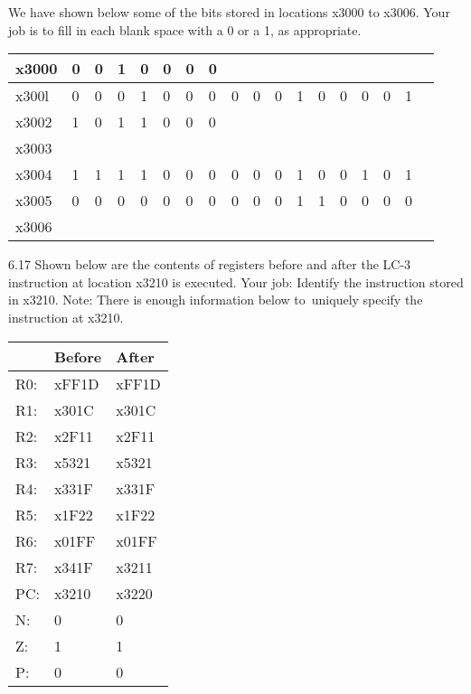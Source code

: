 \documentclass{patt}
\begin{document}
\begin{exercises}
\noindent
We have shown below some of the bits stored in locations x3000 to
x3006. Your job is to fill in each blank space with a 0 or a 1, as
appropriate.

\begin{inlinetable}
\begin{tabular}{|l|l|l|l|l|l|l|l|l|l|l|l|l|l|l|l|l|l|}
\hline
\rule{0pt}{10pt} x3000 & 0 & 0 & 1 & 0 & 0 & 0 & 0 &   &   &   &   &   &   &   &   &  \\\hline
\rule{0pt}{10pt} x300l & 0 & 0 & 0 & 1 & 0 & 0 & 0 & 0 & 0 & 0 & 1 & 0 & 0 & 0 & 0 & 1\\\hline
\rule{0pt}{10pt} x3002 & 1 & 0 & 1 & 1 & 0 & 0 & 0 &   &   &   &   &   &   &   &   &  \\\hline
\rule{0pt}{10pt} x3003 &   &   &   &   &   &   &   &   &   &   &   &   &   &   &   &  \\\hline
\rule{0pt}{10pt} x3004 & 1 & 1 & 1 & 1 & 0 & 0 & 0 & 0 & 0 & 0 & 1 & 0 & 0 & 1 & 0 & 1\\\hline
\rule{0pt}{10pt} x3005 & 0 & 0 & 0 & 0 & 0 & 0 & 0 & 0 & 0 & 0 & 1 & 1 & 0 & 0 & 0 & 0\\\hline
\rule{0pt}{10pt} x3006 &   &   &   &   &   &   &   &   &   &   &   &   &   &   &   &  \\
\hline
\end{tabular}
\end{inlinetable}

\item[6.17] Shown below are the contents of registers before and after
  the LC-3 instruction at location x3210 is executed. Your job:
  Identify the instruction stored in x3210. Note: There is enough
  information below to~uniquely specify the instruction at x3210.

\begin{inlinetable}
\begin{tabular}{|l|l|l|}
\hline
\rule{0pt}{10pt} &Before& After\\
\hline
\rule{0pt}{10pt} R0: & xFF1D & xFF1D\\
\rule{0pt}{10pt} R1: & x301C & x301C\\
\rule{0pt}{10pt} R2: & x2F11 & x2F11\\
\rule{0pt}{10pt} R3: & x5321 & x5321\\
\rule{0pt}{10pt} R4: & x331F & x331F\\
\rule{0pt}{10pt} R5: & x1F22 & x1F22\\
\rule{0pt}{10pt} R6: & x01FF & x01FF\\
\rule{0pt}{10pt} R7: & x341F & x3211\\
\rule{0pt}{10pt} PC: & x3210 & x3220\\
\rule{0pt}{10pt} N: & 0 & 0\\
\rule{0pt}{10pt} Z: & 1 & 1\\
\rule{0pt}{10pt} P: & 0 & 0\\\hline
\end{tabular}
\end{inlinetable}


\end{exercises}
\end{document}
